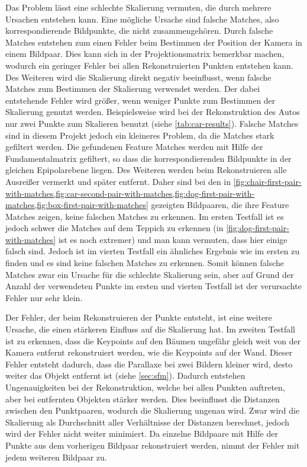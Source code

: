 Das Problem lässt eine schlechte Skalierung vermuten, die durch mehrere Ursachen entstehen kann. 
Eine mögliche Ursache sind falsche Matches, also korrespondierende Bildpunkte, die nicht zusammengehören.
Durch falsche Matches entstehen zum einen Fehler beim Bestimmen der Position der Kamera in einem Bildpaar.
Dies kann sich in der Projektionsmatrix bemerkbar machen, wodurch ein geringer Fehler bei allen Rekonstruierten Punkten entstehen kann.
Des Weiteren wird die Skalierung direkt negativ beeinflusst, wenn falsche Matches zum Bestimmen der Skalierung verwendet werden. 
Der dabei entstehende Fehler wird größer, wenn weniger Punkte zum Bestimmen der Skalierung genutzt werden.
Beispielsweise wird bei der Rekonstruktion des Autos nur zwei Punkte zum Skalieren benutzt (siehe \cref{tab:car-results}).
Falsche Matches sind in diesem Projekt jedoch ein kleineres Problem, da die Matches stark gefiltert werden.
Die gefundenen Feature Matches werden mit Hilfe der Fundamentalmatrix gefiltert, so dass die korrespondierenden Bildpunkte in der gleichen Epipolarebene liegen.
Des Weiteren werden beim Rekonstruieren alle Ausreißer vermerkt und später entfernt.
Daher sind bei den in \cref{fig:chair-first-pair-with-matches,fig:car-second-pair-with-matches,fig:dog-first-pair-with-matches,fig:box-first-pair-with-matches} gezeigten Bildpaaren, die ihre Feature Matches zeigen, keine falschen Matches zu erkennen.
Im ersten Testfall ist es jedoch schwer die Matches auf dem Teppich zu erkennen (in \cref{fig:dog-first-pair-with-matches} ist es noch extremer) und man kann vermuten, dass hier einige falsch sind.
Jedoch ist im vierten Testfall ein ähnliches Ergebnis wie im ersten zu finden und es sind keine falschen Matches zu erkennen.
Somit können falsche Matches zwar ein Ursache für die schlechte Skalierung sein, aber auf Grund der Anzahl der verwendeten Punkte im ersten und vierten Testfall ist der verursachte Fehler nur sehr klein.

Der Fehler, der beim Rekonstruieren der Punkte entsteht, ist eine weitere Ursache, die einen stärkeren Einfluss auf die Skalierung hat. 
Im zweiten Testfall ist zu erkennen, dass die Keypoints auf den Bäumen ungefähr gleich weit von der Kamera entfernt rekonstruiert werden, wie die Keypoints auf der Wand.
Dieser Fehler entsteht dadurch, dass die Parallaxe bei zwei Bildern kleiner wird, desto weiter das Objekt entfernt ist (siehe \cref{sec:sfm}). %
Dadurch entstehen Ungenauigkeiten bei der Rekonstruktion, welche bei allen Punkten auftreten, aber bei entfernten Objekten stärker werden. %
Dies beeinflusst die Distanzen zwischen den Punktpaaren, wodurch die Skalierung ungenau wird.
Zwar wird die Skalierung als Durchschnitt aller Verhältnisse der Distanzen berechnet, jedoch wird der Fehler nicht weiter minimiert.
Da einzelne Bildpaare mit Hilfe der Punkte aus dem vorherigen Bildpaar rekonstruiert werden, nimmt der Fehler mit jedem weiteren Bildpaar zu. 

